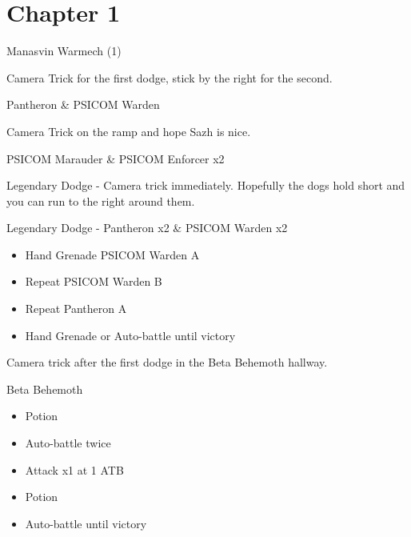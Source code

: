 \chapter{Chapter 1}

	\begin{battle}[1:06]{Manasvin Warmech (1)}
	\end{battle}

	Camera Trick for the first dodge, stick by the right for the second.

	\begin{battle}[0:16]{Pantheron \& PSICOM Warden}
	\end{battle}

	Camera Trick on the ramp and hope Sazh is nice.

	\begin{battle}[0:39]{PSICOM Marauder \& PSICOM Enforcer x2}
	\end{battle}

	Legendary Dodge - Camera trick immediately. Hopefully the dogs hold short and you can run to the right around them.

	\begin{battle}[0:18]{Legendary Dodge - Pantheron x2 \& PSICOM Warden x2}
		\begin{itemize}
			\item Hand Grenade PSICOM Warden A
			\item Repeat PSICOM Warden B
			\item Repeat Pantheron A
			\item Hand Grenade or Auto-battle until victory
		\end{itemize}

	\end{battle}

	Camera trick after the first dodge in the Beta Behemoth hallway.

	\begin{battle}[0:51]{Beta Behemoth}
		\begin{itemize}
			\item Potion
			\item Auto-battle twice
			\item Attack x1 at 1 ATB
			\item Potion
			\item Auto-battle until victory
		\end{itemize}
	\end{battle}


